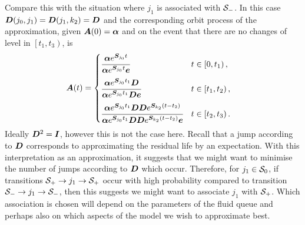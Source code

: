 Compare this with the situation where \({j_1}\) is associated with \(\mathcal{S}_-\). In this case \(\boldsymbol{D}({j_0},{j_1})=\boldsymbol{D}({j_1},k_2)=\boldsymbol{D}\) and the corresponding orbit process of the approximation, given \(\boldsymbol A(0) = \boldsymbol \alpha\) and on the event that there are no changes of level in \(\left[t_1,t_3\right)\), is 
\begin{align*}
\boldsymbol A(t) &= \begin{cases} 
	\cfrac{\boldsymbol \alpha e^{\boldsymbol{S}_{j_0}t}}{\boldsymbol \alpha e^{\boldsymbol{S}_{{j_0}}t}\boldsymbol e} & t\in\left[0,t_1\right), \\[10pt]
	\cfrac{\boldsymbol \alpha e^{\boldsymbol{S}_{j_0}t_1}\boldsymbol{D}}{\boldsymbol \alpha e^{\boldsymbol{S}_{j_0}t_1}\boldsymbol{D}\boldsymbol e} & t\in\left[t_1,t_2\right), \\[10pt] 
	\cfrac{\boldsymbol \alpha e^{\boldsymbol{S}_{j_0}t_1}\boldsymbol{D}\boldsymbol{D}e^{\boldsymbol{S}_{k_2}(t-t_2)}}{\boldsymbol \alpha e^{\boldsymbol{S}_{j_0}t_1}\boldsymbol{D}\boldsymbol{D}e^{\boldsymbol{S}_{k_2}(t-t_2)}\boldsymbol e} & t\in\left[t_2,t_3\right).
\end{cases}
\end{align*}
Ideally \(\boldsymbol D^2=\boldsymbol I\), however this is not the case here. Recall that a jump according to \(\boldsymbol{D}\) corresponds to approximating the residual life by an expectation. With this interpretation as an approximation, it suggests that we might want to minimise the number of jumps according to \(\boldsymbol D\) which occur. Therefore, for \(j_1\in{}\mathcal{S}_0\), if transitions \(\mathcal{S}_+\to j_1\to \mathcal{S}_+\) occur with high probability compared to transition \(\mathcal{S}_-\to j_1\to \mathcal{S}_-\), then this suggests we might want to associate \(j_1\) with \(\mathcal{S}_+\). Which association is chosen will depend on the parameters of the fluid queue and perhaps also on which aspects of the model we wish to approximate best. 


